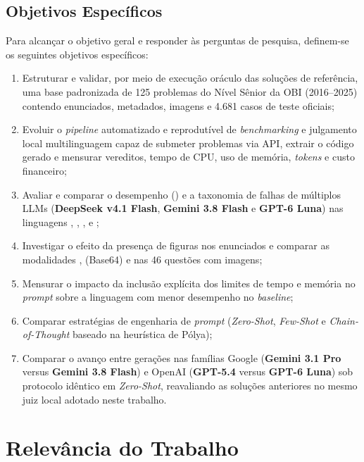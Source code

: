 \subsection{Objetivos Específicos}\label{sec:intro-objetivos-esp}

Para alcançar o objetivo geral e responder às perguntas de pesquisa, definem-se os seguintes objetivos específicos:

\begin{enumerate}
    \item Estruturar e validar, por meio de execução oráculo das soluções de referência, uma base padronizada de 125 problemas do Nível Sênior da OBI (2016--2025) contendo enunciados, metadados, imagens e 4.681 casos de teste oficiais;
    \item Evoluir o \textit{pipeline} automatizado e reprodutível de \textit{benchmarking} e julgamento local multilinguagem capaz de submeter problemas via API, extrair o código gerado e mensurar vereditos, tempo de CPU, uso de memória, \textit{tokens} e custo financeiro;
    \item Avaliar e comparar o desempenho () e a taxonomia de falhas de múltiplos LLMs (\textbf{DeepSeek v4.1 Flash}, \textbf{Gemini 3.8 Flash} e \textbf{GPT-6 Luna}) nas linguagens , , ,  e ;
    \item Investigar o efeito da presença de figuras nos enunciados e comparar as modalidades ,  (Base64) e  nas 46 questões com imagens;
    \item Mensurar o impacto da inclusão explícita dos limites de tempo e memória no \textit{prompt} sobre a linguagem com menor desempenho no \textit{baseline};
    \item Comparar estratégias de engenharia de \textit{prompt} (\textit{Zero-Shot}, \textit{Few-Shot} e \textit{Chain-of-Thought} baseado na heurística de Pólya);
    \item Comparar o avanço entre gerações nas famílias Google (\textbf{Gemini 3.1 Pro} versus \textbf{Gemini 3.8 Flash}) e OpenAI (\textbf{GPT-5.4} versus \textbf{GPT-6 Luna}) sob protocolo idêntico em  \textit{Zero-Shot}, reavaliando as soluções anteriores no mesmo juiz local adotado neste trabalho.
\end{enumerate}

\section{Relevância do Trabalho}\label{sec:intro-relevancia}

